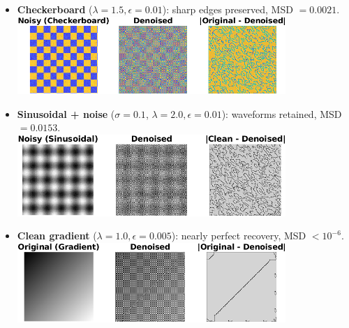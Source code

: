 \documentclass[11pt]{article}
\begin{document}
\begin{itemize}
  \item \textbf{Checkerboard} (\(\lambda=1.5,\epsilon=0.01\)): sharp edges preserved, MSD \(=0.0021\).\\
    \includegraphics[width=0.8\textwidth]{../utils/results/test_images/checkerboard_denoising.png}
  \item \textbf{Sinusoidal + noise} (\(\sigma=0.1\), \(\lambda=2.0,\epsilon=0.01\)): waveforms retained, MSD \(=0.0153\).\\
    \includegraphics[width=0.8\textwidth]{../utils/results/test_images/high_noise_sinusoidal.png}
  \item \textbf{Clean gradient} (\(\lambda=1.0,\epsilon=0.005\)): nearly perfect recovery, MSD \(<10^{-6}\).\\
    \includegraphics[width=0.8\textwidth]{../utils/results/test_images/zero_noise_gradient.png}
\end{itemize}
\end{document}
